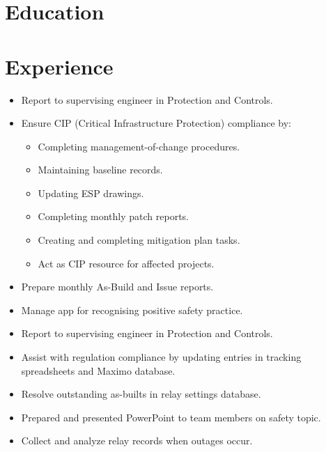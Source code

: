 \documentclass{lsanche_cv}
\begin{document}

\medskip


\smallskip


\begin{multicols*}{2}
  \section{Education}

  \section{Experience}
    \begin{itemize}
      \item Report to supervising engineer in Protection and Controls.
			\item Ensure CIP (Critical Infrastructure Protection) compliance by:
            \begin{itemize}
              \item Completing management-of-change procedures.
              \item Maintaining baseline records.
              \item Updating ESP drawings.
              \item Completing monthly patch reports.
              \item Creating and completing mitigation plan tasks.
              \item Act as CIP resource for affected projects.
            \end{itemize}
			\item Prepare monthly As-Build and Issue reports.
			\item Manage app for recognising positive safety practice.
    \end{itemize}

	\divider

    \begin{itemize}
      \item Report to supervising engineer in Protection and Controls.
			\item Assist with regulation compliance by updating entries in tracking spreadsheets and Maximo database.
			\item Resolve outstanding as-builts in relay settings database.
			\item Prepared and presented PowerPoint to team members on safety topic.
			\item Collect and analyze relay records when outages occur.
    \end{itemize}


\end{multicols*}
\end{document}
